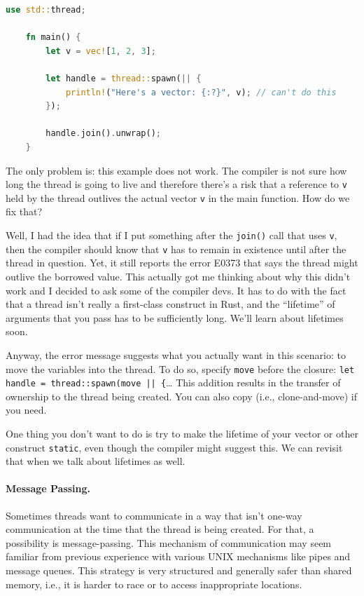\begin{lstlisting}[language=Rust]
    use std::thread;

    fn main() {
        let v = vec![1, 2, 3];

        let handle = thread::spawn(|| {
            println!("Here's a vector: {:?}", v); // can't do this
        });

        handle.join().unwrap();
    }
\end{lstlisting}

The only problem is: this example does not work. The compiler is not sure how long the thread is going to live and therefore there's a risk that a reference to \texttt{v} held by the thread outlives the actual vector \texttt{v} in the main function. How do we fix that?

Well, I had the idea that if I put something after the \texttt{join()} call that uses \texttt{v}, then the compiler should know that \texttt{v} has to remain in existence until after the thread in question. Yet, it still reports the error E0373 that says the thread might outlive the borrowed value. This actually got me thinking about why this didn't work and I decided to ask some of the compiler devs. It has to do with the fact that a thread isn't really a first-class construct in Rust, and the ``lifetime'' of arguments that you pass has to be sufficiently long. We'll learn about lifetimes soon.

Anyway, the error message suggests what you actually want in this scenario: to move the variables into the thread. To do so, specify \texttt{move} before the closure: \texttt{let handle = thread::spawn(move || \{}\ldots{} This addition results in the transfer of ownership to the thread being created. You can also copy (i.e., clone-and-move) if you need. 

One thing you don't want to do is try to make the lifetime of your vector or other construct \texttt{static}, even though the compiler might suggest this. We can revisit that when we talk about lifetimes as well.

\paragraph{Message Passing.} Sometimes threads want to communicate in a way that isn't one-way communication at the time that the thread is being created. For that, a possibility is message-passing. This mechanism of communication may seem familiar from previous experience with various UNIX mechanisms like pipes and message queues. This strategy is very structured and generally safer than shared memory, i.e., it is harder to race or to access inappropriate locations.

